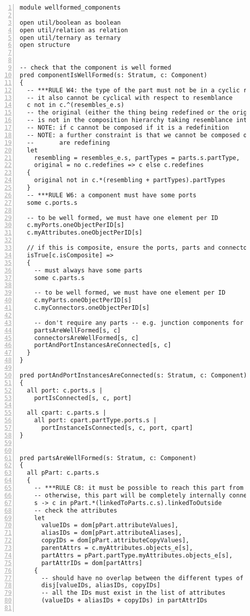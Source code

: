 \lstset{frame=tb, aboveskip=12pt, belowskip=-3pt, breaklines=true, basicstyle=\tiny\ttfamily, tabsize=2, mathescape=true}
\begin{lstlisting}[caption={wellformed\_components.als}, numbers=left]
module wellformed_components

open util/boolean as boolean
open util/relation as relation
open util/ternary as ternary
open structure


-- check that the component is well formed
pred componentIsWellFormed(s: Stratum, c: Component)
{
  -- ***RULE W4: the type of the part must not be in a cyclic relationship with itself through containment
  -- it also cannot be cyclical with respect to resemblance
  c not in c.^(resembles_e.s)
  -- the original (either the thing being redefined or the original)
  -- is not in the composition hierarchy taking resemblance into account
  -- NOTE: if c cannot be composed if it is a redefinition
  -- NOTE: a further constraint is that we cannot be composed of the thing we
  --       are redefining
  let
    resembling = resembles_e.s, partTypes = parts.s.partType,
    original = no c.redefines => c else c.redefines
  {
    original not in c.*(resembling + partTypes).partTypes
  }
  -- ***RULE W6: a component must have some ports
  some c.ports.s
  
  -- to be well formed, we must have one element per ID
  c.myPorts.oneObjectPerID[s]
  c.myAttributes.oneObjectPerID[s]
  
  // if this is composite, ensure the ports, parts and connectors are well formed
  isTrue[c.isComposite] =>
  {
    -- must always have some parts
    some c.parts.s
  
    -- to be well formed, we must have one element per ID
    c.myParts.oneObjectPerID[s]
    c.myConnectors.oneObjectPerID[s]

    -- don't require any parts -- e.g. junction components for altering connection interfaces
    partsAreWellFormed[s, c]
    connectorsAreWellFormed[s, c]
    portAndPortInstancesAreConnected[s, c]
  }
}

pred portAndPortInstancesAreConnected(s: Stratum, c: Component)
{
  all port: c.ports.s |
    portIsConnected[s, c, port]
    
  all cpart: c.parts.s |
    all port: cpart.partType.ports.s |
      portInstanceIsConnected[s, c, port, cpart]
}


pred partsAreWellFormed(s: Stratum, c: Component)
{
  all pPart: c.parts.s
  {
    -- ***RULE C8: it must be possible to reach this part from a series of connections from the owning component
    -- otherwise, this part will be completely internally connected -- an island
    s -> c in pPart.*(linkedToParts.c.s).linkedToOutside
    -- check the attributes
    let
      valueIDs = dom[pPart.attributeValues],
      aliasIDs = dom[pPart.attributeAliases],
      copyIDs = dom[pPart.attributeCopyValues],
      parentAttrs = c.myAttributes.objects_e[s],
      partAttrs = pPart.partType.myAttributes.objects_e[s],
      partAttrIDs = dom[partAttrs]
    {
      -- should have no overlap between the different types of possibilities
      disj[valueIDs, aliasIDs, copyIDs]
      -- all the IDs must exist in the list of attributes
      (valueIDs + aliasIDs + copyIDs) in partAttrIDs


\end{lstlisting}

